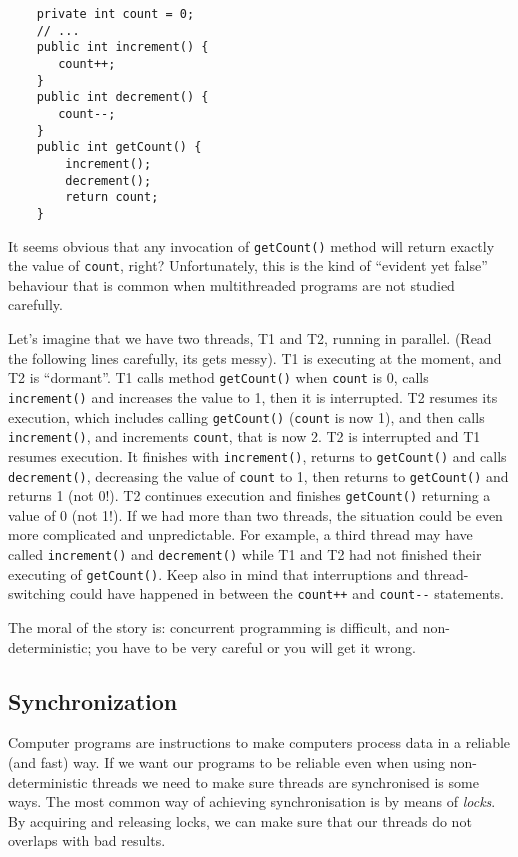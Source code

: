 \begin{verbatim}
    private int count = 0;
    // ...
    public int increment() {
       count++;
    }
    public int decrement() {
       count--;
    }
    public int getCount() {
        increment();
        decrement();
        return count;
    }
\end{verbatim}

It seems obvious that any invocation of \verb+getCount()+ method will return
exactly the value of \verb+count+, right?
Unfortunately, this is the kind of ``evident yet false'' behaviour
that is common when multithreaded programs are not studied carefully. 

Let's imagine that we have two threads, T1 and T2, running in
parallel. (Read the following lines carefully, its gets messy). 
%
T1 is executing at the moment, and T2 is ``dormant''. 
%
T1 calls method \verb+getCount()+ when \verb+count+ is 0, calls
\verb+increment()+ and increases the value to 1, 
then it is interrupted. 
%
T2 resumes its execution, which includes
calling \verb+getCount()+ (\verb+count+ is now 1), and then calls
\verb+increment()+, and increments \verb+count+, that is now 2. 
% 
T2 is interrupted and T1 resumes execution. It finishes with
\verb+increment()+, returns to \verb+getCount()+ and calls
\verb+decrement()+, decreasing the value of \verb+count+ to 1, then
returns to \verb+getCount()+ and returns 1 (not 0!). 
%
T2 continues execution and finishes \verb+getCount()+ returning a
value of 0 (not 1!).
%
If we had more than two threads, the situation could be even more
complicated and unpredictable. For example, a third thread may have called
\verb+increment()+ and \verb+decrement()+ while T1 and T2 had not
finished their executing of \verb+getCount()+. 
%
Keep also in mind that interruptions and thread-switching
could have happened in between the \verb_count++_ and \verb+count--+
statements.

The moral of the story is: concurrent programming is difficult, and
non-deterministic; you have to be very careful or you will get it
wrong. 

\subsection{Synchronization}
\label{sec:synchronization}

Computer programs are instructions to make computers process data in a
reliable (and fast) way. If we want our programs to be reliable even
when using non-deterministic threads we need to make sure threads are
synchronised is some ways. The most common way of achieving
synchronisation is by means of \emph{locks}. By acquiring and
releasing locks, we can make sure that our threads do not overlaps
with bad results. 

